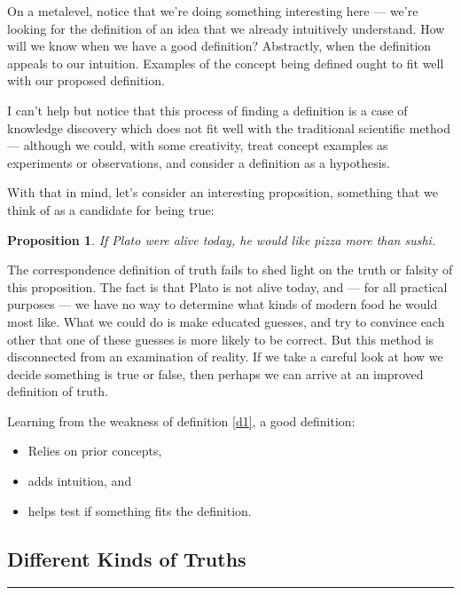 \documentclass[11pt, oneside]{article}   	%
\newtheorem{propn}{Proposition}
\newcommand\hr{\bigskip\hrule\bigskip}
\begin{document}
On a metalevel, notice that we're doing something interesting here --- we're
looking for the definition of an idea that we already intuitively understand.
How will we know when we have a good definition? Abstractly, when the definition
appeals to our intuition.
Examples of the concept being defined ought to fit well with our
proposed definition.

I can't help but notice that this process of finding a definition is a case of
knowledge discovery which does not fit well with the traditional scientific
method --- although we could, with some creativity, treat concept examples as
experiments or observations, and consider a definition as a hypothesis.

With that in mind, let's consider an interesting proposition, something that we
think of as a candidate for being true:
\begin{propn}\label{p1}
    If Plato were alive today, he would like pizza more than sushi.
\end{propn}

The correspondence definition of truth fails to shed light
on the truth or falsity of this proposition.
The fact is that Plato is not alive today, and --- for all practical purposes
--- we have no way to determine what kinds of modern food he would most like.
What we could do is make educated guesses, and try to convince each other
that one of these guesses is more likely to be correct. But this method is
disconnected from an examination of reality. If we take a careful look at how we
decide something is true or false, then perhaps we can arrive at an improved
definition of truth.

Learning from the weakness of definition \ref{d1}, a good definition:
\begin{itemize}
    \item Relies on prior concepts,
    \item adds intuition, and
    \item helps test if something fits the definition.
\end{itemize}

\subsection{Different Kinds of Truths}



\hr
\end{document}
